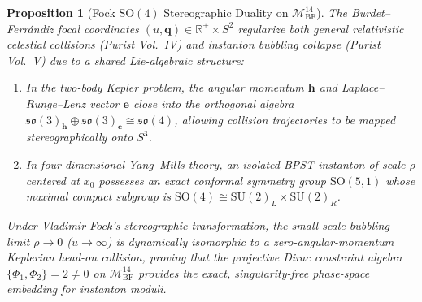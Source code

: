 \documentclass[11pt,a4paper,reqno]{article}
\theoremstyle{plain}
\newtheorem{proposition}[theorem]{Proposition}
\theoremstyle{definition}
\theoremstyle{remark}
\numberwithin{equation}{section}
\newcommand{\Mbf}{\mathcal{M}_{\mathrm{BF}}^{14}}
\begin{document}
\begin{proposition}[Fock $\mathrm{SO}(4)$ Stereographic Duality on $\Mbf$]
\label{prop:fock_so4_duality}
The Burdet--Ferr\'{a}ndiz focal coordinates $(u, \mathbf{q}) \in \mathbb{R}^+ \times S^2$ regularize both general relativistic celestial collisions (Purist Vol.~IV) and instanton bubbling collapse (Purist Vol.~V) due to a shared Lie-algebraic structure: 
\begin{enumerate}[label=\textbf{(\alph*)}, leftmargin=2.0em]
  \item In the two-body Kepler problem, the angular momentum $\mathbf{h}$ and Laplace--Runge--Lenz vector $\mathbf{e}$ close into the orthogonal algebra $\mathfrak{so}(3)_{\mathbf{h}} \oplus \mathfrak{so}(3)_{\mathbf{e}} \cong \mathfrak{so}(4)$, allowing collision trajectories to be mapped stereographically onto $S^3$.
  \item In four-dimensional Yang--Mills theory, an isolated BPST instanton of scale $\rho$ centered at $x_0$ possesses an exact conformal symmetry group $\mathrm{SO}(5,1)$ whose maximal compact subgroup is $\mathrm{SO}(4) \cong \mathrm{SU}(2)_L \times \mathrm{SU}(2)_R$.
\end{enumerate}
Under Vladimir Fock's stereographic transformation, the small-scale bubbling limit $\rho \to 0$ ($u \to \infty$) is dynamically isomorphic to a zero-angular-momentum Keplerian head-on collision, proving that the projective Dirac constraint algebra $\{\Phi_1, \Phi_2\} = 2 \ne 0$ on $\Mbf$ provides the exact, singularity-free phase-space embedding for instanton moduli.
\end{proposition}
\end{document}
